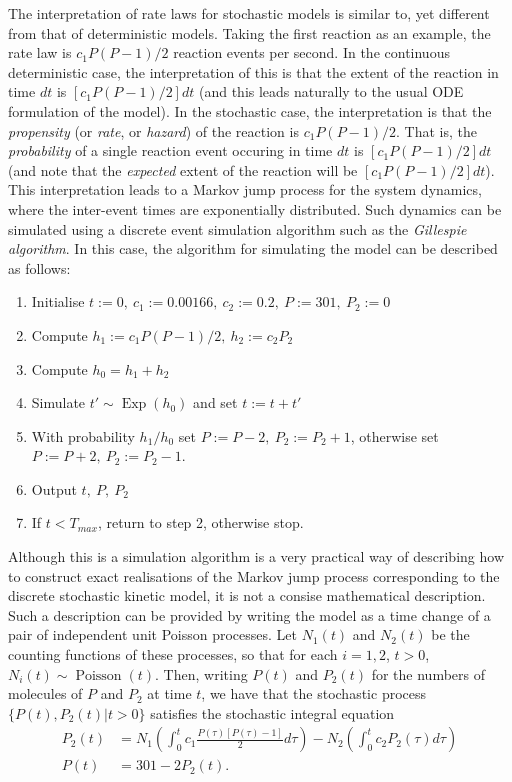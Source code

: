 The interpretation of rate laws for stochastic models is similar
to, yet different from that of deterministic models. Taking the
first reaction as an example, the rate law is $c_1P(P-1)/2$ reaction
events per second. In the continuous deterministic case, the
interpretation of this is that the extent of the reaction in time
$dt$ is $[c_1P(P-1)/2]dt$ (and this leads naturally to the usual ODE
formulation of the model). In the stochastic case, the
interpretation is that the \emph{propensity} (or \emph{rate}, or
\emph{hazard}) of the reaction is $c_1P(P-1)/2$. That is, the
\emph{probability} of a single reaction event occuring in time
$dt$ is $[c_1P(P-1)/2]dt$ (and note that the \emph{expected} extent of
the reaction will be $[c_1P(P-1)/2]dt$). This interpretation leads to a Markov
jump process for the system dynamics, where the inter-event times
are exponentially distributed. Such dynamics can be simulated
using a discrete event simulation algorithm such as the
\emph{Gillespie algorithm}. In this case, the algorithm for
simulating the model can be described as follows:
\begin{enumerate}
\item Initialise $t:=0,\ c_1:=0.00166,\ c_2:=0.2,\ P:=301,\ P_2:=0$
\item Compute $h_1:=c_1P(P-1)/2,\ h_2:=c_2P_2$
\item Compute $h_0=h_1+h_2$
\item Simulate $t'\sim \operatorname{Exp}(h_0)$ and set $t:=t+t'$
\item With probability $h_1/h_0$ set $P:=P-2,\ P_2:=P_2+1$,
otherwise set $P:=P+2,\ P_2:=P_2-1$.
\item Output $t,\ P,\ P_2$
\item If $t<T_{max}$, return to step 2, otherwise stop.
\end{enumerate}
Although this is a simulation algorithm is a very practical way of
describing how to construct exact realisations of the Markov jump
process corresponding to the discrete stochastic kinetic model, it
is not a consise mathematical description. Such a description can
be provided by writing the model as a time change of a pair of
independent unit Poisson processes. Let $N_1(t)$ and $N_2(t)$ be
the counting functions of these processes, so that for each
$i=1,2$, $t>0$, $N_i(t)\sim \operatorname{Poisson}(t)$. Then,
writing $P(t)$ and $P_2(t)$ for the numbers of molecules of $P$
and $P_2$ at time $t$, we have that the stochastic process
$\{P(t),P_2(t)|t>0\}$ satisfies the stochastic integral equation
\begin{align*}
P_2(t) &= N_1\left(\int_0^t
c_1\frac{P(\tau)[P(\tau)-1]}{2}d\tau\right) - N_2\left(\int_0^t
c_2 P_2(\tau)d\tau\right) \\
P(t) &= 301 - 2P_2(t).
\end{align*}


